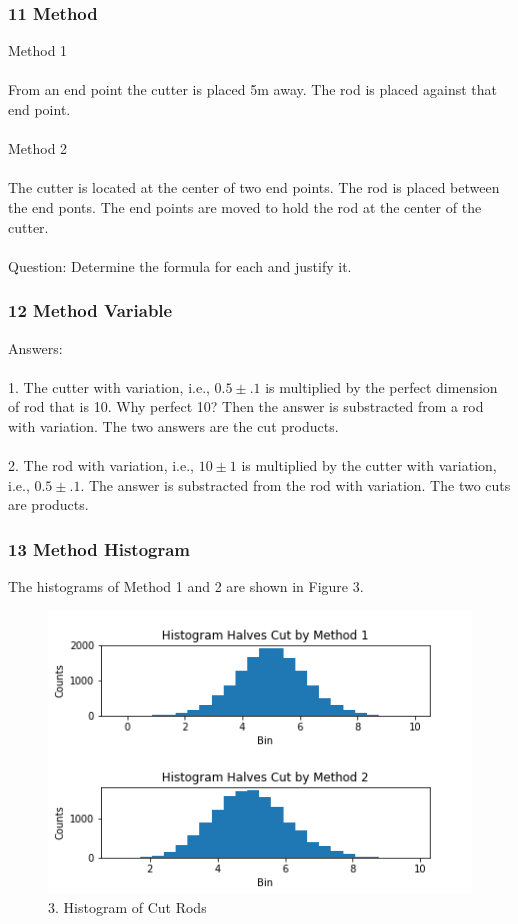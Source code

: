 \documentclass[11pt]{beamer}
\begin{document}
\begin{frame}
\frametitle{11 Method}
\noindent Method 1\\ \ \\     From an end point the cutter is placed 5m away. The rod is placed against     that end point.\\ \ \\     Method 2 \\ \ \\     The cutter is located at the center of two end points. The rod is placed     between the end ponts. The end points are moved to hold the rod at the     center of the cutter. \\ \ \\     Question: Determine the formula for each and justify it.

\end{frame}

\begin{frame}
\frametitle{12 Method Variable}
\noindent Answers: \\ \ \\  1. The cutter with variation, i.e., $0.5 \pm .1$  is    multiplied by the perfect dimension of rod that is 10. Why perfect 10?    Then the answer is substracted from a rod with variation. The two answers    are the cut products. \\ \ \\    2. The rod with variation, i.e., $ 10 \pm 1$ is multiplied by the    cutter with variation, i.e., $0.5 \pm .1$. The answer is substracted from    the rod with variation. The two cuts are products. \\ 

\end{frame}

\begin{frame}
\frametitle{13 Method Histogram}
\noindent The histograms of Method 1 and 2 are shown in Figure 3.
\begin{figure}[H]
\centering\includegraphics[width=1\linewidth,height=0.7\textheight]{Fig03}
\caption{3. Histogram of Cut Rods}
\label{fig:Fig03}
\end{figure}


\end{frame}
\end{document}
